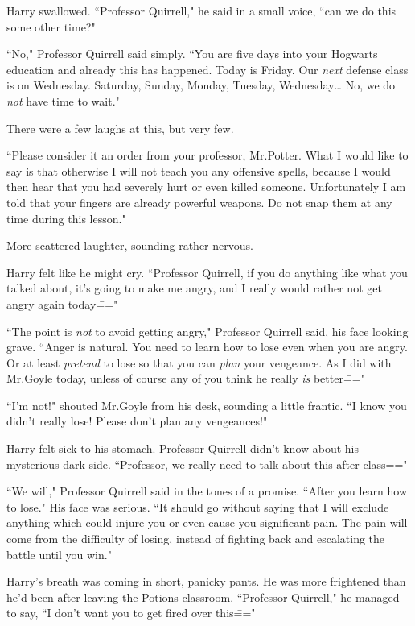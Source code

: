 Harry swallowed. ``Professor Quirrell," he said in a small voice, ``can we do this some other time?"

``No," Professor Quirrell said simply. ``You are five days into your Hogwarts education and already this has happened. Today is Friday. Our \emph{next} defense class is on Wednesday. Saturday, Sunday, Monday, Tuesday, Wednesday{\ldots} No, we do \emph{not} have time to wait."

There were a few laughs at this, but very few.

``Please consider it an order from your professor, Mr.\?Potter. What I would like to say is that otherwise I will not teach you any offensive spells, because I would then hear that you had severely hurt or even killed someone. Unfortunately I am told that your fingers are already powerful weapons. Do not snap them at any time during this lesson."

More scattered laughter, sounding rather nervous.

Harry felt like he might cry. ``Professor Quirrell, if you do anything like what you talked about, it's going to make me angry, and I really would rather not get angry again today\==="

``The point is \emph{not} to avoid getting angry," Professor Quirrell said, his face looking grave. ``Anger is natural. You need to learn how to lose even when you are angry. Or at least \emph{pretend} to lose so that you can \emph{plan} your vengeance. As I did with Mr.\?Goyle today, unless of course any of you think he really \emph{is} better\==="

``I'm not!" shouted Mr.\?Goyle from his desk, sounding a little frantic. ``I know you didn't really lose! Please don't plan any vengeances!"

Harry felt sick to his stomach. Professor Quirrell didn't know about his mysterious dark side. ``Professor, we really need to talk about this after class\==="

``We will," Professor Quirrell said in the tones of a promise. ``After you learn how to lose." His face was serious. ``It should go without saying that I will exclude anything which could injure you or even cause you significant pain. The pain will come from the difficulty of losing, instead of fighting back and escalating the battle until you win."

Harry's breath was coming in short, panicky pants. He was more frightened than he'd been after leaving the Potions classroom. ``Professor Quirrell," he managed to say, ``I don't want you to get fired over this\==="

